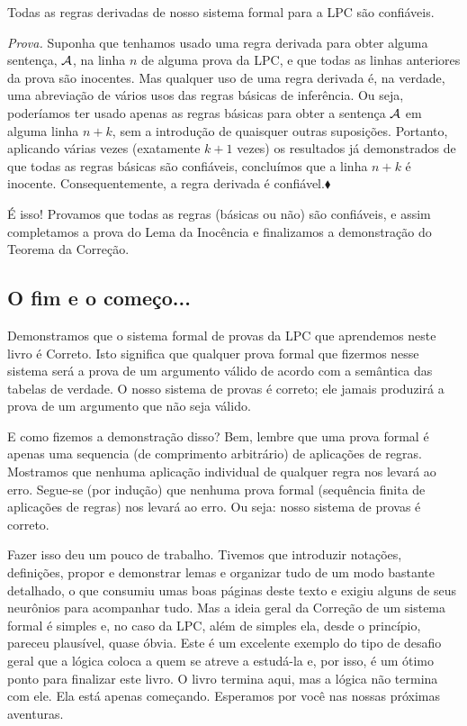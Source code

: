 \begin{factoidboxe}
	Todas as regras derivadas de nosso sistema formal para a LPC são confiáveis.
\end{factoidboxe}
\noindent\emph{Prova.}
	Suponha que tenhamos usado uma regra derivada para obter alguma sentença, $\mathcal{A}$, na linha $n$ de alguma prova da LPC, e que todas as linhas anteriores da prova são inocentes.
	Mas qualquer uso de uma regra derivada é, na verdade, uma abreviação de vários usos das regras básicas de inferência.
	Ou seja, poderíamos ter usado apenas as regras básicas para obter a sentença $\mathcal{A}$ em alguma linha $n+k$, sem a introdução de quaisquer outras suposições.
	Portanto, aplicando várias vezes (exatamente $k+1$ vezes) os resultados já demonstrados de que todas as regras básicas são confiáveis, concluímos que a linha $n+k$ é inocente. Consequentemente, a regra derivada é confiável.$\blacklozenge$

É isso! Provamos que todas as regras (básicas ou não) são confiáveis, e assim completamos a prova do Lema da Inocência e finalizamos a demonstração do Teorema da Correção.


\subsection{O fim e o começo...}
Demonstramos que o sistema formal de provas da LPC que aprendemos neste livro é Correto. Isto significa que qualquer prova formal que fizermos nesse sistema será a prova de um argumento válido de acordo com a semântica das tabelas de verdade.
O nosso sistema de provas é correto; ele jamais produzirá a prova de um argumento que não seja válido.

E como fizemos a demonstração disso? Bem, lembre que uma prova formal é apenas uma sequencia (de comprimento arbitrário) de aplicações de regras.
Mostramos que nenhuma aplicação individual de qualquer regra nos levará ao erro. Segue-se (por indução) que nenhuma prova formal (sequência finita de aplicações de regras) nos levará ao erro. Ou seja: nosso sistema de provas é correto.

Fazer isso deu um pouco de trabalho.
Tivemos que introduzir notações, definições, propor e demonstrar lemas e organizar tudo de um modo bastante detalhado, o que consumiu umas boas páginas deste texto e exigiu alguns de seus neurônios para acompanhar tudo.
Mas a ideia geral da Correção de um sistema formal é simples e, no caso da LPC, além de simples ela, desde o princípio, pareceu plausível, quase óbvia.
Este é um excelente exemplo do tipo de desafio geral que a lógica coloca a quem se atreve a estudá-la e, por isso, é um ótimo ponto para finalizar este livro.
O livro termina aqui, mas a lógica não termina com ele. Ela está apenas começando. Esperamos por você nas nossas próximas aventuras. 



